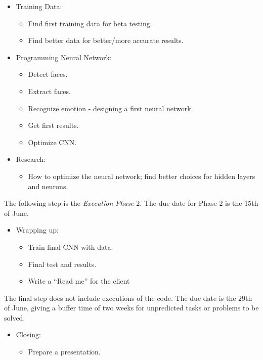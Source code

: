 \documentclass[]{article}
\begin{document}
\begin{itemize}
\item Training Data:
	\begin{itemize}
	\item Find first training dara for beta testing.
	\item Find better data for better/more accurate results.
	\end{itemize}

\item Programming Neural Network:
	\begin{itemize}
	\item Detect faces.
	\item Extract faces.
	\item Recognize emotion - designing a first neural network.
	\item Get first results.
	\item Optimize CNN.
	\end{itemize}
	
\item Research:
	\begin{itemize}
	\item How to optimize the neural network; find better choices for hidden layers and neurons. 
	\end{itemize}
\end{itemize}

The following step is the \textit{Execution Phase $2$}. The due date for Phase $2$ is the 15th of June.

\begin{itemize}

\item Wrapping up:
	\begin{itemize}
	\item Train final CNN with data.
	\item Final test and results.
	\item Write a ``Read me'' for the client
	\end{itemize}

\end{itemize}

The final step does not include executions of the code. The due date is the 29th of June, giving a buffer time of two weeks for unpredicted tasks or problems to be solved.

\begin{itemize}
\item Closing:
	\begin{itemize}
	\item Prepare a presentation.
	\end{itemize}

\end{itemize}
\end{document}
